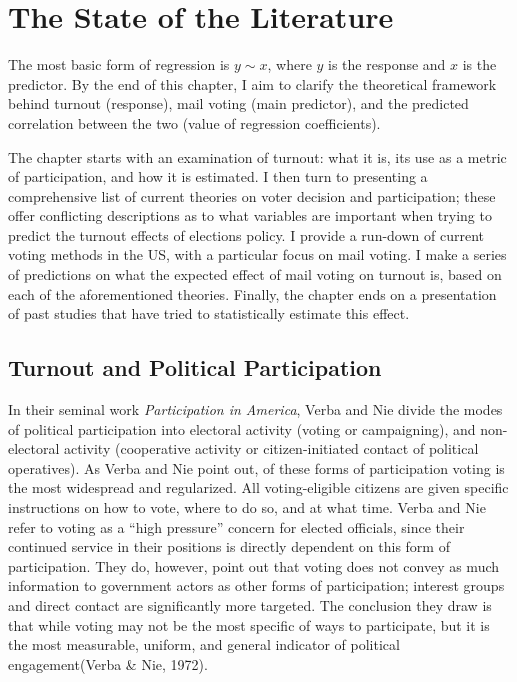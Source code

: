\documentclass[12pt,twoside]{reedthesis}
\begin{document}
  \chapter{The State of the Literature}\label{rmd-basics}
  
  The most basic form of regression is \(y\sim x\), where \(y\) is the
  response and \(x\) is the predictor. By the end of this chapter, I aim
  to clarify the theoretical framework behind turnout (response), mail
  voting (main predictor), and the predicted correlation between the two
  (value of regression coefficients).
  
  The chapter starts with an examination of turnout: what it is, its use
  as a metric of participation, and how it is estimated. I then turn to
  presenting a comprehensive list of current theories on voter decision
  and participation; these offer conflicting descriptions as to what
  variables are important when trying to predict the turnout effects of
  elections policy. I provide a run-down of current voting methods in the
  US, with a particular focus on mail voting. I make a series of
  predictions on what the expected effect of mail voting on turnout is,
  based on each of the aforementioned theories. Finally, the chapter ends
  on a presentation of past studies that have tried to statistically
  estimate this effect.
  
  \section{Turnout and Political
  Participation}\label{turnout-and-political-participation}
  
  In their seminal work \emph{Participation in America}, Verba and Nie
  divide the modes of political participation into electoral activity
  (voting or campaigning), and non-electoral activity (cooperative
  activity or citizen-initiated contact of political operatives). As Verba
  and Nie point out, of these forms of participation voting is the most
  widespread and regularized. All voting-eligible citizens are given
  specific instructions on how to vote, where to do so, and at what time.
  Verba and Nie refer to voting as a ``high pressure'' concern for elected
  officials, since their continued service in their positions is directly
  dependent on this form of participation. They do, however, point out
  that voting does not convey as much information to government actors as
  other forms of participation; interest groups and direct contact are
  significantly more targeted. The conclusion they draw is that while
  voting may not be the most specific of ways to participate, but it is
  the most measurable, uniform, and general indicator of political
  engagement(Verba \& Nie, 1972).
  
\end{document}
